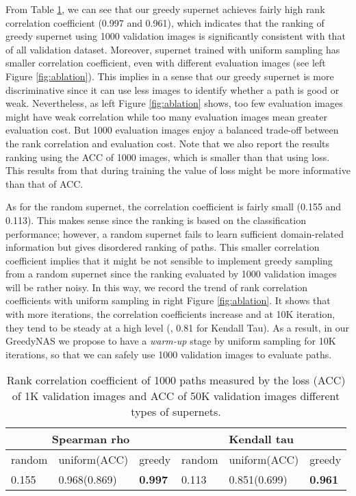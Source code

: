 \documentclass[10pt,twocolumn,letterpaper]{article}
\begin{document}
From Table \ref{tbl:correlation}, we can see that our greedy supernet achieves fairly high rank correlation coefficient (0.997 and 0.961), which indicates that the ranking of greedy supernet using 1000 validation images is significantly consistent with that of all validation dataset. Moreover, supernet trained with uniform sampling has smaller correlation coefficient, even with different evaluation images (see left Figure \ref{fig:ablation}). This implies in a sense that our greedy supernet is more discriminative since it can use less images to identify whether a path is good or weak. Nevertheless, as left Figure \ref{fig:ablation} shows, too few evaluation images might have weak correlation while too many evaluation images mean greater evaluation cost. But 1000 evaluation images enjoy a balanced trade-off between the rank correlation and evaluation cost. Note that we also report the results \wrt ranking using the ACC of 1000 images, which is smaller than that using loss. This results from that during training the value of loss might be more informative than that of ACC. 

As for the random supernet, the correlation coefficient is fairly small (0.155 and 0.113). This makes sense since the ranking is based on the classification performance; however, a random supernet fails to learn sufficient domain-related information but gives disordered ranking of paths. This smaller correlation coefficient implies that it might be not sensible to implement greedy sampling from a random supernet since the ranking evaluated by 1000 validation images will be rather noisy. In this way, we record the trend of rank correlation coefficients with uniform sampling in right Figure \ref{fig:ablation}. It shows that with more iterations, the correlation coefficients increase and at 10K iteration, they tend to be steady at a high level (\eg, 0.81 for Kendall Tau). As a result, in our GreedyNAS we propose to have a \textit{warm-up} stage by uniform sampling for 10K iterations, so that we can safely use 1000 validation images to evaluate paths. 


\begin{table}
	\caption{Rank correlation coefficient of 1000 paths measured by the loss (ACC) of 1K validation images and ACC of 50K validation images \wrt different types of supernets.}
	\label{tbl:correlation}
	\centering
\small
	\vspace{-3mm}
	\begin{tabular}{p{0.7cm}p{1.6cm}p{0.7cm}||p{0.7cm}p{1.6cm}p{0.7cm}} \hline
		\multicolumn{3}{c||}{Spearman rho} & \multicolumn{3}{c}{Kendall tau} \\ \hline
		random & uniform(ACC) & greedy & random & uniform(ACC) & greedy \\ \hline
		0.155 & 0.968(0.869) & \textbf{0.997} & 0.113 & 0.851(0.699) & \textbf{0.961} \\ \hline
	\end{tabular}	
	\vspace{-5mm}
\end{table}
\end{document}

